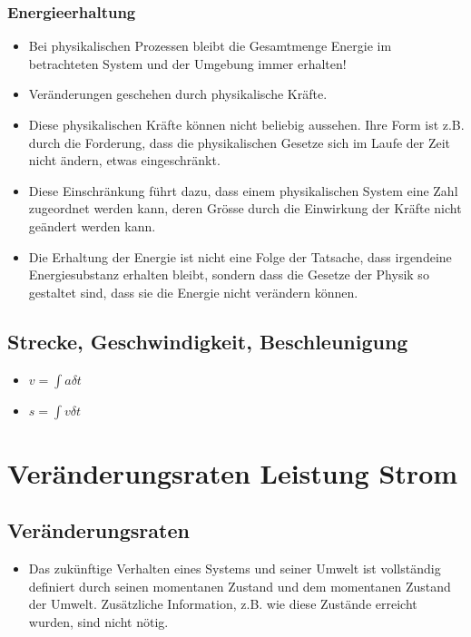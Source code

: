 \documentclass[8pt,a4paper]{scrartcl}
\begin{document}
\begin{multicols*}{3}
		\subsubsection{Energieerhaltung}			
			\begin{itemize}\itemsep0pt		
				\item Bei physikalischen Prozessen bleibt die Gesamtmenge Energie im betrachteten System und der Umgebung immer erhalten! 					
				\item Veränderungen geschehen durch physikalische Kräfte. 
				\item Diese physikalischen Kräfte können nicht beliebig aussehen. Ihre Form ist z.B. durch die Forderung, dass die physikalischen Gesetze sich im Laufe der Zeit nicht ändern, etwas eingeschränkt. 
				\item Diese Einschränkung führt dazu, dass einem physikalischen System eine Zahl zugeordnet werden kann, deren Grösse durch die Einwirkung der Kräfte nicht geändert werden kann. 		
				\item Die Erhaltung der Energie ist nicht eine Folge der Tatsache, dass irgendeine Energiesubstanz erhalten bleibt, sondern dass die Gesetze der Physik so gestaltet sind, dass sie die Energie nicht verändern können. 
				
			\end{itemize}

		\subsection{Strecke, Geschwindigkeit, Beschleunigung}
			\begin{itemize}\itemsep0pt				
				\item $v=\int a \delta t$
				\item $s=\int v \delta t$
			\end{itemize}			
			
	\section{Veränderungsraten Leistung Strom}
		\subsection{Veränderungsraten}
			\begin{itemize}\itemsep0pt			
				\item Das zukünftige Verhalten eines Systems und seiner Umwelt ist vollständig definiert durch seinen momentanen Zustand und dem momentanen Zustand der Umwelt. Zusätzliche Information, z.B. wie diese Zustände erreicht wurden, sind nicht nötig.
				

\end{itemize}
\end{multicols*}
\end{document}
